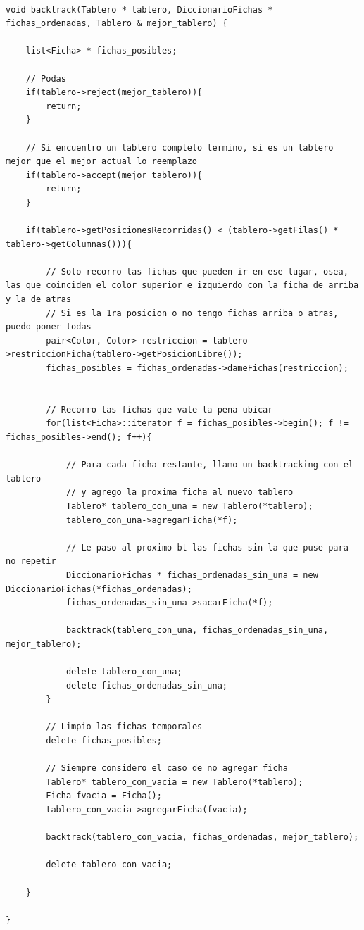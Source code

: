 \begin{lstlisting}

void backtrack(Tablero * tablero, DiccionarioFichas * fichas_ordenadas, Tablero & mejor_tablero) {
	
	list<Ficha> * fichas_posibles;
	
	// Podas
	if(tablero->reject(mejor_tablero)){ 
		return; 
	}
	
	// Si encuentro un tablero completo termino, si es un tablero mejor que el mejor actual lo reemplazo
	if(tablero->accept(mejor_tablero)){ 
		return; 
	}
	
	if(tablero->getPosicionesRecorridas() < (tablero->getFilas() * tablero->getColumnas())){
				
		// Solo recorro las fichas que pueden ir en ese lugar, osea, las que coinciden el color superior e izquierdo con la ficha de arriba y la de atras
		// Si es la 1ra posicion o no tengo fichas arriba o atras, puedo poner todas
		pair<Color, Color> restriccion = tablero->restriccionFicha(tablero->getPosicionLibre());
		fichas_posibles = fichas_ordenadas->dameFichas(restriccion);
		

		// Recorro las fichas que vale la pena ubicar
		for(list<Ficha>::iterator f = fichas_posibles->begin(); f != fichas_posibles->end(); f++){

			// Para cada ficha restante, llamo un backtracking con el tablero
			// y agrego la proxima ficha al nuevo tablero
			Tablero* tablero_con_una = new Tablero(*tablero);
			tablero_con_una->agregarFicha(*f);

			// Le paso al proximo bt las fichas sin la que puse para no repetir
			DiccionarioFichas * fichas_ordenadas_sin_una = new DiccionarioFichas(*fichas_ordenadas);
			fichas_ordenadas_sin_una->sacarFicha(*f);	

			backtrack(tablero_con_una, fichas_ordenadas_sin_una, mejor_tablero);

			delete tablero_con_una;
			delete fichas_ordenadas_sin_una;
		}
		
		// Limpio las fichas temporales
		delete fichas_posibles;
		
		// Siempre considero el caso de no agregar ficha
		Tablero* tablero_con_vacia = new Tablero(*tablero);
		Ficha fvacia = Ficha();
		tablero_con_vacia->agregarFicha(fvacia);
			
		backtrack(tablero_con_vacia, fichas_ordenadas, mejor_tablero);
		
		delete tablero_con_vacia;
	
	}
	
}

\end{lstlisting}

